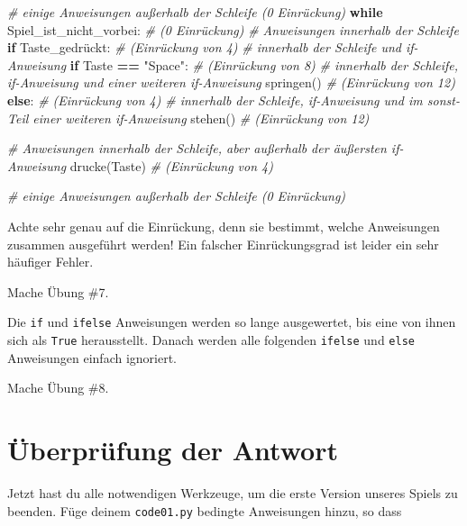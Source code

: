 \documentclass[
]{book}
\newenvironment{Shaded}{\begin{snugshade}}{\end{snugshade}}
\newcommand{\CommentTok}[1]{\textcolor[rgb]{0.56,0.35,0.01}{\textit{#1}}}
\newcommand{\ControlFlowTok}[1]{\textcolor[rgb]{0.13,0.29,0.53}{\textbf{#1}}}
\newcommand{\NormalTok}[1]{#1}
\newcommand{\OperatorTok}[1]{\textcolor[rgb]{0.81,0.36,0.00}{\textbf{#1}}}
\newcommand{\StringTok}[1]{\textcolor[rgb]{0.31,0.60,0.02}{#1}}
\begin{document}
\begin{Shaded}
\begin{Highlighting}[]
\CommentTok{\# einige Anweisungen außerhalb der Schleife (0 Einrückung)}
\ControlFlowTok{while}\NormalTok{ Spiel\_ist\_nicht\_vorbei: }\CommentTok{\# (0 Einrückung)}
    \CommentTok{\# Anweisungen innerhalb der Schleife}
    \ControlFlowTok{if}\NormalTok{ Taste\_gedrückt: }\CommentTok{\# (Einrückung von 4)}
        \CommentTok{\# innerhalb der Schleife und if{-}Anweisung}
        \ControlFlowTok{if}\NormalTok{ Taste }\OperatorTok{==} \StringTok{"Space"}\NormalTok{: }\CommentTok{\# (Einrückung von 8)}
            \CommentTok{\# innerhalb der Schleife, if{-}Anweisung und einer weiteren if{-}Anweisung}
\NormalTok{            springen() }\CommentTok{\# (Einrückung von 12)}
        \ControlFlowTok{else}\NormalTok{: }\CommentTok{\# (Einrückung von 4)}
            \CommentTok{\# innerhalb der Schleife, if{-}Anweisung und im sonst{-}Teil einer weiteren if{-}Anweisung}
\NormalTok{            stehen() }\CommentTok{\# (Einrückung von 12)}

    \CommentTok{\# Anweisungen innerhalb der Schleife, aber außerhalb der äußersten if{-}Anweisung}
\NormalTok{    drucke(Taste) }\CommentTok{\# (Einrückung von 4)}

\CommentTok{\# einige Anweisungen außerhalb der Schleife (0 Einrückung)}
\end{Highlighting}
\end{Shaded}

Achte sehr genau auf die Einrückung, denn sie bestimmt, welche Anweisungen zusammen ausgeführt werden! Ein falscher Einrückungsgrad ist leider ein sehr häufiger Fehler.

Mache Übung \#7.

Die \texttt{if} und \texttt{ifelse} Anweisungen werden so lange ausgewertet, bis eine von ihnen sich als \texttt{True} herausstellt. Danach werden alle folgenden \texttt{ifelse} und \texttt{else} Anweisungen einfach ignoriert.

Mache Übung \#8.

\hypertarget{uxfcberpruxfcfung-der-antwort}{%
\section{Überprüfung der Antwort}\label{uxfcberpruxfcfung-der-antwort}}

Jetzt hast du alle notwendigen Werkzeuge, um die erste Version unseres Spiels zu beenden. Füge deinem \texttt{code01.py} bedingte Anweisungen hinzu, so dass
\end{document}
